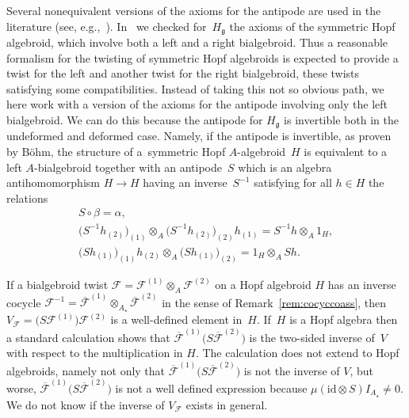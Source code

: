 \documentclass[10pt,a4paper]{amsart}
\def\gg{\mathfrak{g}}
\def\id{\mathrm{id}}
\numberwithin{equation}{section}
\begin{document}
Several nonequivalent versions of the axioms for the antipode are used in the literature (see, e.g.,~\cite{bohmHbk,Bohm,lu,twosha}). In~\cite{halg} we checked for~$H_\gg$ the axioms of the symmetric Hopf algebroid, which involve both a left and a right bialgebroid. Thus a reasonable formalism for the twisting of symmetric Hopf algebroids is expected to provide a twist for the left and another twist for the right bialgebroid, these twists satisfying some compatibilities. Instead of taking this not so obvious path, we here work with a version of the axioms for the antipode involving only the left bialgebroid. We can do this because the antipode for $H_\gg$ is invertible both in the undeformed and deformed case. Namely, if the antipode is invertible, as proven by B\"ohm, the structure of a~symmetric Hopf $A$-algebroid~$H$ is equivalent to a left $A$-bialgebroid together with an antipode~$S$ which is an algebra antihomomorphism $H\to H$ having an inverse~$S^{-1}$ satisfying for all $h\in H$ the relations
\begin{gather*}%
S\circ\beta = \alpha,\\
\big(S^{-1} h_{(2)}\big)_{(1)}\otimes_A\big(S^{-1} h_{(2)}\big)_{(2)}h_{(1)} = S^{-1} h\otimes_A 1_H,\\
\big(S h_{(1)}\big)_{(1)} h_{(2)}\otimes_A\big(S h_{(1)}\big)_{(2)} = 1_H\otimes_A S h.
\end{gather*}

If a bialgebroid twist $\mathcal{F} = \mathcal{F}^{(1)}\otimes_A\mathcal{F}^{(2)}$ on a Hopf algebroid $H$ has an inverse cocycle $\mathcal{F}^{-1}=\overline{\mathcal{F}}^{(1)}\otimes_{A_\star}\overline{\mathcal{F}}^{(2)}$ in the sense of Remark~\ref{rem:cocyccoass}, then $V_{\mathcal{F}} = \big(S\mathcal{F}^{(1)}\big)\mathcal{F}^{(2)}$ is a well-defined element in~$H$. If~$H$ is a Hopf algebra then a standard calculation shows that $\overline{\mathcal{F}}^{(1)}\big(S\overline{\mathcal{F}}^{(2)}\big)$ is the two-sided inverse of~$V$ with respect to the multiplication in $H$. The calculation does not extend to Hopf algebroids, namely not only that $\overline{\mathcal{F}}^{(1)}\big(S\overline{\mathcal{F}}^{(2)}\big)$ is not the inverse of $V$, but worse, $\overline{\mathcal{F}}^{(1)}\big(S\overline{\mathcal{F}}^{(2)}\big)$ is not a well defined expression because $\mu(\id\otimes S)I_{A_\star}\neq 0$. We do not know if the inverse of $V_{\mathcal{F}}$ exists in general.
\end{document}
